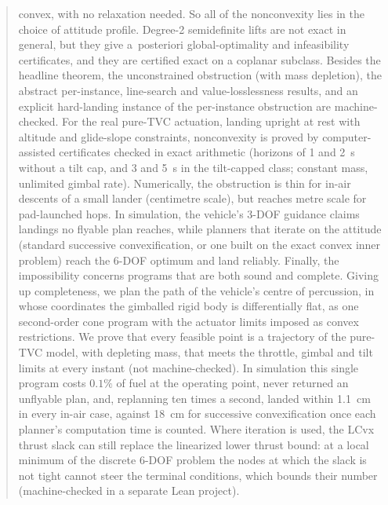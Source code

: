 \documentclass[11pt]{article}
\theoremstyle{plain}
\theoremstyle{definition}
\theoremstyle{remark}
\begin{document}
\begin{abstract}
convex, with no relaxation needed. So all of the nonconvexity lies in the choice of attitude profile. Degree-2
semidefinite lifts are not exact in general, but they give a~posteriori global-optimality and infeasibility
certificates, and they are certified exact on a coplanar subclass. Besides the headline theorem, the unconstrained
obstruction (with mass depletion), the abstract per-instance, line-search and value-losslessness results, and an explicit
hard-landing instance of the per-instance obstruction are machine-checked. For the real pure-TVC actuation, landing upright at rest with altitude and glide-slope constraints, nonconvexity is proved
by computer-assisted certificates checked in exact arithmetic (horizons of 1 and 2~s without a tilt cap, and 3 and 5~s in the
tilt-capped class; constant mass, unlimited gimbal rate).
Numerically, the obstruction is thin for in-air descents of a small lander (centimetre scale), but reaches metre scale for
pad-launched hops. In simulation, the vehicle's 3-DOF guidance claims landings no flyable plan reaches, while planners that iterate on
the attitude (standard successive convexification, or one built on the exact convex inner problem) reach the 6-DOF optimum and land
reliably. Finally, the impossibility concerns programs that are both sound and complete. Giving up completeness, we plan the path of
the vehicle's centre of percussion, in whose coordinates the gimballed rigid body is differentially flat, as one second-order cone
program with the actuator limits imposed as convex restrictions. We prove that every feasible point is a trajectory of the pure-TVC
model, with depleting mass, that meets the throttle, gimbal and tilt limits at every instant (not machine-checked). In simulation this
single program costs $0.1\%$ of fuel at the operating point, never returned an unflyable plan, and, replanning ten times a second,
landed within 1.1~cm in every in-air case, against 18~cm for successive convexification once each planner's computation time is
counted. Where iteration is used, the LCvx thrust slack can still replace the linearized lower thrust bound: at a local minimum of
the discrete 6-DOF problem the nodes at which the slack is not tight cannot steer the terminal conditions, which bounds their
number (machine-checked in a separate Lean project).
\end{abstract}
\end{document}
